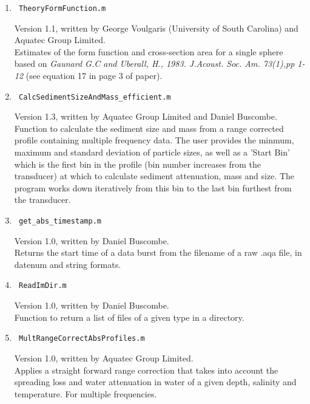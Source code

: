 \documentclass[a4paper,10pt]{report}
\begin{document}
\begin{enumerate}
 \item
\begin{verbatim} TheoryFormFunction.m \end{verbatim}
Version 1.1, written by George Voulgaris (University of South Carolina) and Aquatec Group Limited.\\
Estimates of the form function and cross-section area for a single sphere based on \textit{Gaunard G.C and Uberall, H., 1983. J.Acoust. Soc. Am. 73(1),pp 1-12} (see equation 17 in page 3 of paper). 

 \item
\begin{verbatim} CalcSedimentSizeAndMass_efficient.m \end{verbatim}
Version 1.3, written by Aquatec Group Limited and Daniel Buscombe.\\
Function to calculate the sediment size and mass from a range corrected profile containing multiple frequency data. The user provides the minmum, maximum and standard deviation of particle sizes, as well as a 'Start Bin' which is the first bin in the profile (bin number increases from the transducer) at which to calculate sediment attenuation, mass and size. The program works down iteratively from this bin to the last bin furthest from the transducer.

 \item
\begin{verbatim} get_abs_timestamp.m \end{verbatim}
Version 1.0, written by Daniel Buscombe.\\
Returns the start time of a data burst from the filename of a raw .aqa file, in datenum and string formats.

 \item
\begin{verbatim} ReadImDir.m \end{verbatim}
Version 1.0, written by Daniel Buscombe.\\
Function to return a list of files of a given type in a directory.

 \item
\begin{verbatim} MultRangeCorrectAbsProfiles.m \end{verbatim}
Version 1.0, written by Aquatec Group Limited.\\
Applies a straight forward range correction that takes into account the spreading loss and water attenuation in water of a given depth, salinity and temperature. For multiple frequencies.


\end{enumerate}
\end{document}
